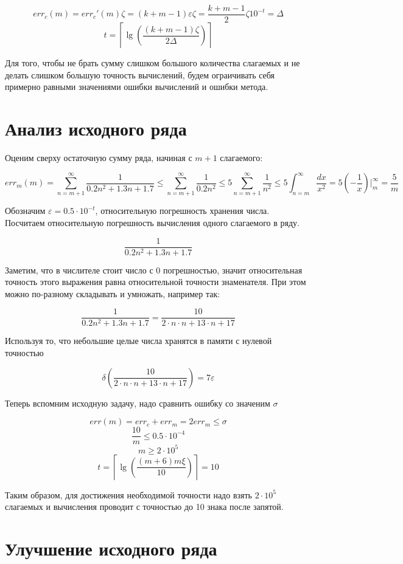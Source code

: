 \documentclass[11pt,a4paper,oneside]{article}
\begin{document}
$$ err_{c}(m) = err_{c}'(m) \zeta = (k + m - 1) \varepsilon \zeta
	= \frac{k + m - 1}{2} \zeta 10^{-t} = \varDelta $$
$$ t = \left\lceil \lg \left( \frac{(k + m - 1) \zeta}{2 \varDelta} \right) \right\rceil $$

Для того, чтобы не брать сумму слишком большого количества слагаемых и не делать слишком большую точность вычислений, будем ограичивать себя примерно равными значениями ошибки вычислений и ошибки метода.

\section{Анализ исходного ряда}

Оценим сверху остаточную сумму ряда, начиная с $m + 1$ слагаемого:

$$ err_{m}(m) = \sum_{n = m + 1}^{\infty} \frac{1}{0.2n^2 + 1.3n + 1.7} 
	\le \sum_{n = m + 1}^{\infty} \frac{1}{0.2n^2}
	\le 5 \sum_{n = m + 1}^{\infty} \frac{1}{n^2}
	\le 5 \int_{n = m}^{\infty} \frac{dx}{x^2}
	= 5 (- \frac{1}{x})\biggr|_{m}^{\infty}
	= \frac{5}{m}$$
	
Обозначим $\varepsilon = 0.5 \cdot 10^{-t}$, относительную погрешность хранения числа. Посчитаем относительную погрешность вычисления одного слагаемого в ряду.

$$ \frac{1}{0.2n^2 + 1.3n + 1.7} $$

Заметим, что в числителе стоит число с 0 погрешностью, значит относительная точность этого выражения равна относительной точности знаменателя. При этом можно по-разному складывать и умножать, например так:

$$ \frac{1}{0.2n^2 + 1.3n + 1.7} = \frac{10}{2 \cdot n \cdot n + 13 \cdot n + 17} $$

Используя то, что небольшие целые числа хранятся в памяти с нулевой точностью

$$ \delta\left( \frac{10}{2 \cdot n \cdot n + 13 \cdot n + 17} \right) = 7 \varepsilon $$

Теперь вспомним исходную задачу, надо сравнить ошибку со значеним $\sigma$

$$ err(m) = err_{c} + err_{m} = 2 err_{m} \le \sigma $$
$$ \frac{10}{m} \le 0.5 \cdot 10^{-4} $$
$$ m \ge 2 \cdot 10^5 $$
$$ t = \left\lceil \lg(\frac{(m + 6) m \xi}{10}) \right\rceil = 10 $$

Таким образом, для достижения необходимой точности надо взять $ 2 \cdot 10^5 $ слагаемых и вычисления проводит с точностью до 10 знака после запятой.

\section{Улучшение исходного ряда}
\end{document}
